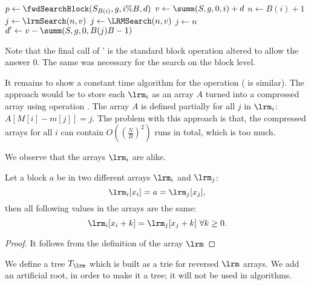 \begin{algorithm}
\begin{algorithmic}
	\State $p \gets \fwdSearchBlock(S_{B(i)}, g, i \% B, d)$ 
		\State {}
	\Else
		\State $v \gets \summ(S, g, 0, i) + d$
		\State $n \gets B(i) + 1$
			\State $j \gets \lrmSearch(n, v)$
			\State $j \gets \LRMSearch(n, v)$
		\Else
			\State $j \gets n$
		\EndIf
		 
			\State {}
		\Else
			\State $d' \gets v - \summ(S, g, 0, B(j) B - 1)$
			\State {}
		\EndIf
	\EndIf
\EndFunction
\end{algorithmic}
\end{algorithm}

Note that the final call of \fwdSearchBlock{}' is the standard block operation \fwdSearchBlock{} altered to allow the answer $0$.
The same was necessary for the search on the block level.

\bigbreak

It remains to show a constant time algorithm for the operation \lrmSearch{} (\LRMSearch{} is similar).
The \naive{} approach would be to store each $\lrm_i$ as an array $A$ turned into a compressed array using operation \succ{}.
The array $A$ is defined partially for all $j$ in $\lrm_i$: $ A[M[i] - m[j]] = j$.
The problem with this approach is that, the compressed arrays for all $i$ can contain $O\left(\left(\frac{N}{B}\right)^2\right)$ runs in total, which is too much.

\bigbreak

We observe that the arrays $\lrm_i$ are alike.
\begin{lemma}
	Let a block $a$ be in two different arrays $\lrm_i$ and $\lrm_j$: 
	$$ \lrm_i[x_i] = a = \lrm_j[x_j], $$
	then all following values in the arrays are the same:
	$$ \lrm_i[x_i + k] = \lrm_j[x_j + k] \ \forall k \ge 0. $$
\end{lemma}
\begin{proof}
	It follows from the definition of the array $\lrm$
\end{proof}

\label{Tlrm} We define a tree $T_{\lrm}$ which is built as a trie for reversed $\lrm$ arrays.
We add an artificial root, in order to make it a tree; it will not be used in algorithms.

